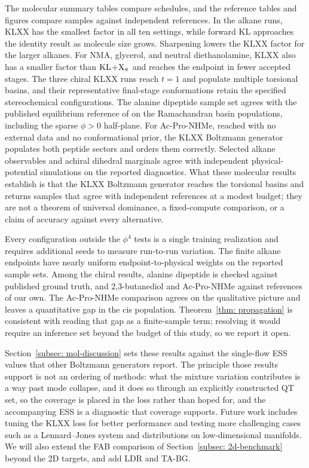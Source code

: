 \documentclass{article}
\begin{document}
{\color{blue}The molecular summary tables compare schedules, and the reference tables and figures compare samples against independent references.} In the alkane runs, KLXX has the smallest factor in {\color{blue}all ten settings}, while forward KL approaches the identity result as molecule size grows. Sharpening lowers the KLXX factor for the larger alkanes. For NMA, glycerol, and neutral diethanolamine, KLXX also has a smaller factor than $\mathrm{KL}$+$\mathrm{X}_\pi$ and reaches the endpoint in fewer accepted stages. {\color{blue}The three chiral KLXX runs reach \(t=1\) and populate multiple torsional basins, and their representative final-stage conformations retain the specified stereochemical configurations.} The alanine dipeptide sample set {\color{blue}agrees with} the published equilibrium reference of \citet{midgley2022flow} on the {\color{blue}Ramachandran basin populations}, including the sparse \(\phi>0\) half-plane. For Ac-Pro-NHMe, reached with no external data and no conformational prior, the KLXX Boltzmann generator populates both peptide sectors and orders them correctly. Selected alkane observables and achiral dihedral marginals agree with independent physical-potential simulations on the reported diagnostics. {\color{blue}What these molecular results establish is that the KLXX Boltzmann generator reaches the torsional basins and returns samples that agree with independent references at a modest budget; they are not a theorem of universal dominance, a fixed-compute comparison, or a claim of accuracy against every alternative.}

{\color{blue}Every configuration outside the $\phi^4$ tests is a single training realization and requires additional seeds to measure run-to-run variation.} The finite alkane endpoints have nearly uniform endpoint-to-physical weights on the reported sample sets. Among the chiral results, alanine dipeptide is checked against published ground truth, and 2,3-butanediol and Ac-Pro-NHMe against references of our own. The Ac-Pro-NHMe comparison agrees on the qualitative picture and leaves a quantitative gap in the cis population. {\color{blue}Theorem~\ref{thm: propagation} is consistent with reading that gap as a finite-sample term}; resolving it would require an inference set beyond the budget of this study, so we report it open.

{\color{blue}Section~\ref{subsec: mol-discussion} sets these results against the single-flow ESS values that other Boltzmann generators report. The principle those results support is not an ordering of methods: what the mixture variation contributes is a way past mode collapse, and it does so through an explicitly constructed QT set, so the coverage is placed in the loss rather than hoped for, and the accompanying ESS is a diagnostic that coverage supports.} Future work includes tuning the KLXX loss for better performance and testing more challenging cases such as a Lennard--Jones system and distributions on low-dimensional manifolds. {\color{blue}We will also extend the FAB comparison of Section~\ref{subsec: 2d-benchmark} beyond the 2D targets, and add LDR and TA-BG.} 
\end{document}
